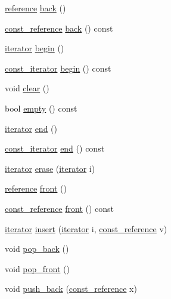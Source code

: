 \begin{DoxyCompactItemize}
\item 
\hyperlink{classmy__deque_a4c34c14f397b7676445b37c87003116b}{reference} \hyperlink{classmy__deque_a1d9aadb5bedc29da86d4323587cd5e4d}{back} ()
\item 
\hyperlink{classmy__deque_ad50d8b378580088cf77fa43f0640e49c}{const\-\_\-reference} \hyperlink{classmy__deque_ac273f9574a95af619b9f0dcc0d2e89d0}{back} () const 
\item 
\hyperlink{classmy__deque_1_1iterator}{iterator} \hyperlink{classmy__deque_aef8cac69d47cb1c274896b82ba8f453a}{begin} ()
\item 
\hyperlink{classmy__deque_1_1const__iterator}{const\-\_\-iterator} \hyperlink{classmy__deque_a8612539eff4ee446f85ffb30abf91a69}{begin} () const 
\item 
void \hyperlink{classmy__deque_aa29f90c63cde532f5fc169e8e66b514c}{clear} ()
\item 
bool \hyperlink{classmy__deque_a2b4f029c47afbdbf057639c5a6816d6c}{empty} () const 
\item 
\hyperlink{classmy__deque_1_1iterator}{iterator} \hyperlink{classmy__deque_a2576ee71790ebe55ac4200c506540bb5}{end} ()
\item 
\hyperlink{classmy__deque_1_1const__iterator}{const\-\_\-iterator} \hyperlink{classmy__deque_af465c3f8483634e4e656d90f8d0d88fb}{end} () const 
\item 
\hyperlink{classmy__deque_1_1iterator}{iterator} \hyperlink{classmy__deque_a68328ee9d14996c56ccac5e9981741d5}{erase} (\hyperlink{classmy__deque_1_1iterator}{iterator} i)
\item 
\hyperlink{classmy__deque_a4c34c14f397b7676445b37c87003116b}{reference} \hyperlink{classmy__deque_a0eae28af0ffdd813d1f94f57d393fdf8}{front} ()
\item 
\hyperlink{classmy__deque_ad50d8b378580088cf77fa43f0640e49c}{const\-\_\-reference} \hyperlink{classmy__deque_a0f1239043b7339b8237a0c8bc663be6b}{front} () const 
\item 
\hyperlink{classmy__deque_1_1iterator}{iterator} \hyperlink{classmy__deque_af5dee5eeded9eb5392b09731cc126d76}{insert} (\hyperlink{classmy__deque_1_1iterator}{iterator} i, \hyperlink{classmy__deque_ad50d8b378580088cf77fa43f0640e49c}{const\-\_\-reference} v)
\item 
void \hyperlink{classmy__deque_a63cc9691ee90701693e948246311c498}{pop\-\_\-back} ()
\item 
void \hyperlink{classmy__deque_a85c322cdc4f629e44abdcf369fdd3dab}{pop\-\_\-front} ()
\item 
void \hyperlink{classmy__deque_a8502c625c87616e74c415ed25000338b}{push\-\_\-back} (\hyperlink{classmy__deque_ad50d8b378580088cf77fa43f0640e49c}{const\-\_\-reference} x)

\end{DoxyCompactItemize}
